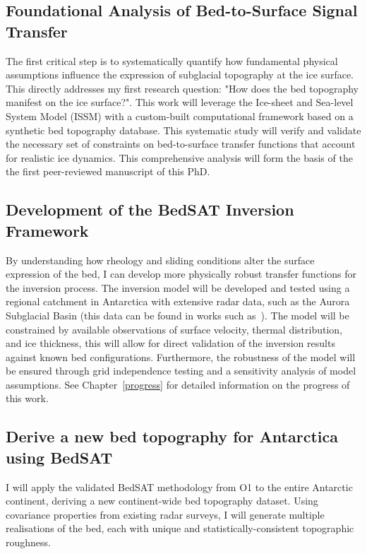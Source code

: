 \subsection{Foundational Analysis of Bed-to-Surface Signal Transfer}\label{paper1}

The first critical step is to systematically quantify how fundamental physical assumptions influence the expression of subglacial topography at the ice surface.
This directly addresses my first research question: "How does the bed topography manifest on the ice surface?". This work will leverage the Ice-sheet and Sea-level System Model (ISSM) with a custom-built computational framework based on a synthetic bed topography database. This systematic study will verify and validate the necessary set of constraints on bed-to-surface transfer functions that account for realistic ice dynamics. This comprehensive analysis will form the basis of the the first peer-reviewed manuscript of this PhD.

\subsection{Development of the BedSAT Inversion Framework}

By understanding how rheology and sliding conditions alter the surface expression of the bed, I can develop more physically robust transfer functions for the inversion process. The inversion model will be developed and tested using a regional catchment in Antarctica with extensive radar data, such as the Aurora Subglacial Basin (this data can be found in works such as~\cite{Young_2011}). The model will be constrained by available observations of surface velocity, thermal distribution, and ice thickness, this will allow for direct validation of the inversion results against known bed configurations. Furthermore, the robustness of the model will be ensured through grid independence testing and a sensitivity analysis of model assumptions. See Chapter~\ref{progress} for detailed information on the progress of this work.

\subsection{Derive a new bed topography for Antarctica using BedSAT}

I will apply the validated BedSAT methodology from O1 to the entire Antarctic continent, deriving a new continent-wide bed topography dataset. Using covariance properties from existing radar surveys, I will generate multiple realisations of the bed, each with unique and statistically-consistent topographic roughness.

